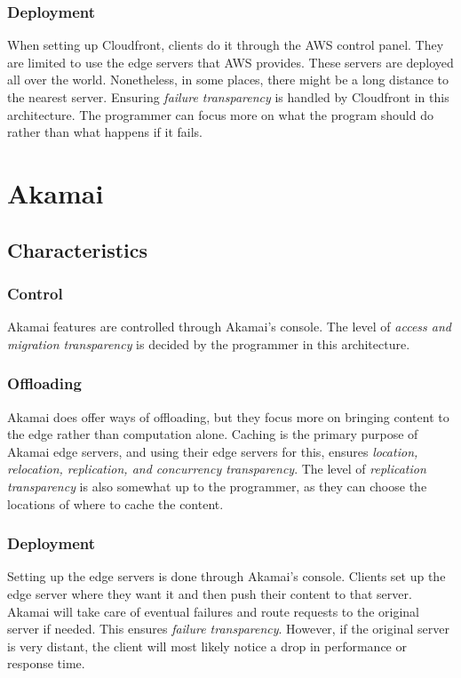 \subsubsection{Deployment}
When setting up Cloudfront, clients do it through the AWS control panel. They are limited to use the edge servers that AWS provides. These servers are deployed all over the world. Nonetheless, in some places, there might be a long distance to the nearest server. Ensuring \textit{failure transparency} is handled by Cloudfront in this architecture. The programmer can focus more on what the program should do rather than what happens if it fails. 









\section{Akamai}
\subsection{Characteristics}
\subsubsection{Control}
Akamai features are controlled through Akamai's console. The level of \textit{access and migration transparency} is decided by the programmer in this architecture.

\subsubsection{Offloading}
Akamai does offer ways of offloading, but they focus more on bringing content to the edge rather than computation alone. Caching is the primary purpose of Akamai edge servers, and using their edge servers for this, ensures \textit{location, relocation, replication, and concurrency transparency}. The level of \textit{replication transparency} is also somewhat up to the programmer, as they can choose the locations of where to cache the content.

\subsubsection{Deployment}
Setting up the edge servers is done through Akamai's console. Clients set up the edge server where they want it and then push their content to that server. Akamai will take care of eventual failures and route requests to the original server if needed. This ensures \textit{failure transparency}. However, if the original server is very distant, the client will most likely notice a drop in performance or response time.


